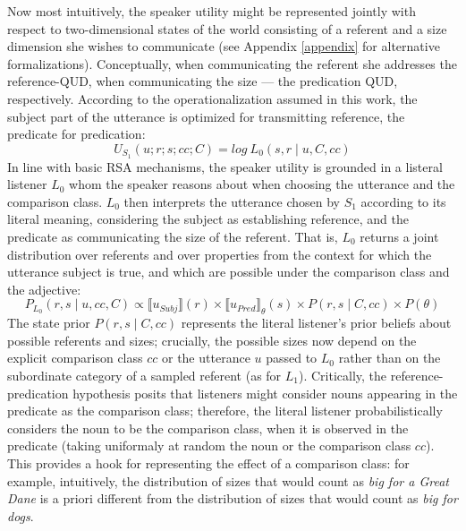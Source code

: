Now most intuitively, the speaker utility might be represented jointly with respect to two-dimensional states of the world consisting of a referent and a size dimension she wishes to communicate (see Appendix \ref{appendix} for alternative formalizations). Conceptually, when communicating the referent she addresses the reference-QUD, when communicating the size --- the predication QUD, respectively. According to the operationalization assumed in this work, the subject part of the utterance is optimized for transmitting reference, the predicate for predication: 
\begin{equation}
\label{model1}
U_{S_1} (u; r; s; cc; C) = log \: L_0 (s, r \mid u, C, cc) 
\end{equation}
In line with basic RSA mechanisms, the speaker utility is grounded in a listeral listener $L_0$ whom the speaker reasons about when choosing the utterance and the comparison class. 
$L_0$ then interprets the utterance chosen by $S_1$ according to its literal meaning, considering the subject as establishing reference, and the predicate as communicating the size of the referent. 
That is, $L_0$ returns a joint distribution over referents and over properties from the context for which the utterance subject is true, and which are possible under the comparison class and the adjective: %
\begin{equation}
P_{L_0} (r, s \mid u, cc, C) \propto \llbracket u_{Subj} \rrbracket (r)  \times  \llbracket u_{Pred} \rrbracket_{\theta} (s) \times P(r, s \mid C, cc) \times P(\theta)
\end{equation}
The state prior $P(r, s \mid C, cc)$ represents the literal listener's prior beliefs about possible referents and sizes; crucially, the possible sizes now depend on the explicit comparison class $cc$ or the utterance $u$ passed to $L_0$ rather than on the subordinate category of a sampled referent (as for $L_1$). Critically, the reference-predication hypothesis posits that listeners might consider nouns appearing in the predicate as the comparison class; therefore, the literal listener probabilistically considers the noun to be the comparison class, when it is observed in the predicate (taking uniformaly at random the noun or the comparison class $cc$). This provides a hook for representing the effect of a comparison class: for example, intuitively, the distribution of sizes that would count as \emph{big for a Great Dane} is a priori different from the distribution of sizes that would count as \emph{big for dogs}. 
